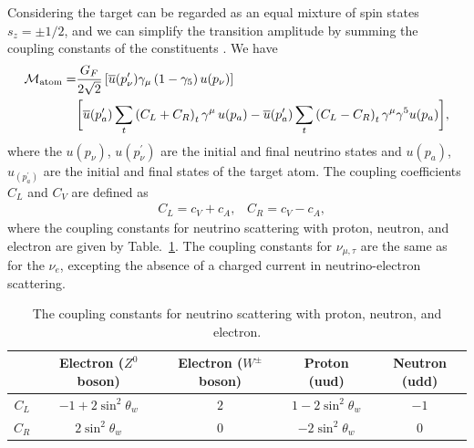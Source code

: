 Considering the target can be regarded as an equal mixture of spin states $s_z=\pm1/2$, and we can simplify the transition amplitude by summing the coupling constants of the constituents \cite{Lewis:1979mu,Sehgal:1986gn}. We have
\begin{align}
\label{Transition}
\mathcal{M}_\mathrm{atom}=&\frac{G_F}{2\sqrt{2}}\left[\overline{u}(p^\prime_\nu)\gamma_\mu\left(1-\gamma_5\right)u(p_\nu)\right]\notag\\&\bigg[\overline{u}(p^\prime_{a})\sum_t\left(C_L+C_R\right)_t\gamma^\mu\,u(p_{a})-\overline{u}(p^\prime_{a})\sum_t\left(C_L-C_R\right)_t\gamma^\mu\gamma^5u(p_{a})\bigg],
\end{align}
where the $u(p_\nu)$, $u(p^\prime_\nu)$ are the initial and final neutrino states and $u(p_a)$, $u_(p^\prime_a)$ are the initial and final states of the target atom. 
The coupling coefficients $C_L$ and $C_V$ are defined as
\begin{align}
&C_L=c_V+c_A,\,\,\,\,\,C_R=c_V-c_A,
\end{align}
where the coupling constants for neutrino scattering with proton, neutron, and electron are given by Table.~\ref{Table_coupling}. The coupling constants for  $\nu_{\mu,\tau}$ are the same as for the $\nu_e$, excepting  the absence  of a charged current in neutrino-electron scattering.
\begin{table}[h]
\begin{tabular}[c]{c|c|c|c|c}
\hline\hline
& Electron ($Z^0$ boson) & Electron ($W^\pm$ boson) & Proton (uud) & Neutron (udd)\\
\hline
$C_L$ & $-1+2\sin^2\theta_w$ & $2$ & $1-2\sin^2\theta_w$ & $-1$ \\
\hline
$C_R$ & $2\sin^2\theta_w$ & $0$ &$-2\sin^2\theta_w$ & $0$ \\
\hline\hline
\end{tabular}
\caption{The coupling constants for neutrino scattering with proton, neutron, and electron.}
\label{Table_coupling}  
\end{table}

